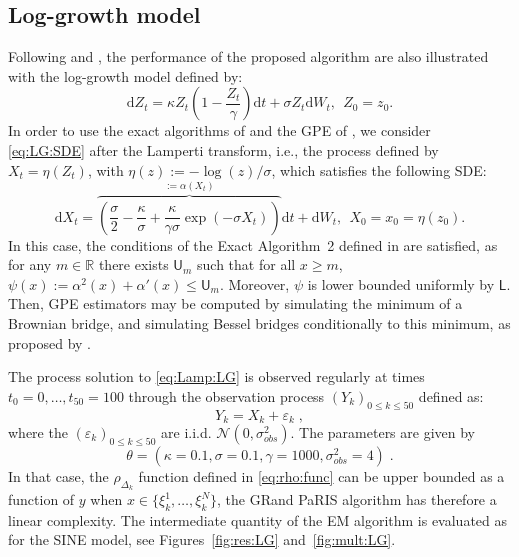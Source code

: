 \documentclass[12pt]{article}
\newcommand{\rmd}{\mathrm{d}}
\newcommand{\eqsp}{\;}
\newcommand{\1}{\mathrm{1}}
\begin{document}
\subsection*{Log-growth model}
Following \cite{beskos:papaspiliopoulos:roberts:fearnhead:2006} and \cite{olsson:westerborn:2016}, the performance of the proposed algorithm are also illustrated with the log-growth model defined by:
\begin{equation}
\rmd Z_t = \kappa Z_t\left(1-\frac{Z_t}{\gamma}\right)\rmd t + \sigma Z_t \rmd W_t,~~Z_0=z_0. \label{eq:LG:SDE}
\end{equation}
In order to use the exact algorithms of \cite{beskos:papaspiliopoulos:roberts:fearnhead:2006} and the GPE of \cite{fearnhead:papaspiliopoulos:roberts:2008}, we consider  \eqref{eq:LG:SDE} after the Lamperti transform, i.e., the process defined by $X_t=\eta(Z_t)$, with $\eta(z) := -\log (z)/\sigma$,  which satisfies the following SDE:
\begin{equation}
\rmd X_t = \overbrace{\left( \frac{\sigma}{2} -  \frac{\kappa}{\sigma} + \frac{\kappa}{\gamma\sigma}\exp\left(-\sigma X_t\right)\right)}^{:=\alpha(X_t)}\rmd t +\rmd W_t,~~X_0=x_0=\eta(z_0).\label{eq:Lamp:LG}
\end{equation}
In this case, the conditions of the Exact Algorithm~2 defined in \cite{beskos:papaspiliopoulos:roberts:fearnhead:2006} are satisfied, as for any $m \in \mathbb{R}$ there exists $\mathsf{U}_m$ such that for all $x\ge m$, $\psi(x):=\alpha^2(x)+\alpha'(x) \leq \mathsf{U}_m$. Moreover, $\psi$ is lower bounded uniformly by  $\mathsf{L}$.  Then, GPE estimators may be computed by simulating the minimum of a Brownian bridge, and simulating Bessel bridges conditionally to this minimum, as proposed by \cite{beskos:papaspiliopoulos:roberts:fearnhead:2006}.

The process solution to \eqref{eq:Lamp:LG} is observed regularly at times $t_0=0,\dots,t_{50}=100$ through the observation process $(Y_k)_{0\le k\le 50}$ defined as:
\begin{equation}
Y_k = X_k + \varepsilon_k\label{eq:obs:LG}\eqsp,
\end{equation}
where the $(\varepsilon_k)_{0\le k \le 50}$ are i.i.d. $ \mathcal{N}(0,\sigma^2_{obs})$.
The parameters are given by $$\theta =(\kappa=0.1,\sigma=0.1,\gamma=1000,\sigma^2_{obs}=4)\eqsp.$$
In that case, the $\rho_{\Delta_k}$ function defined in \eqref{eq:rho:func} can be upper bounded as a function of $y$ when $x\in \{\xi_k^1,\dots, \xi_k^N\}$, the GRand PaRIS algorithm has therefore a linear complexity. The intermediate quantity of the EM algorithm is evaluated  as for the SINE model, see Figures~\ref{fig:res:LG} and~\ref{fig:mult:LG}.
\end{document}
